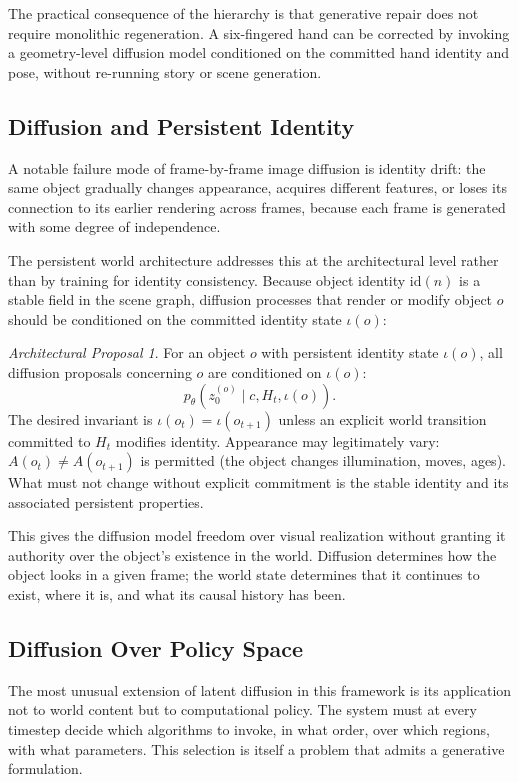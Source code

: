 \documentclass[11pt,a4paper]{article}
\theoremstyle{plain}
\theoremstyle{definition}
\theoremstyle{remark}
\newtheorem{proposal}[theorem]{Architectural Proposal}
\begin{document}
The practical consequence of the hierarchy is that generative repair does not require monolithic regeneration. A six-fingered hand can be corrected by invoking a geometry-level diffusion model conditioned on the committed hand identity and pose, without re-running story or scene generation.

\subsection{Diffusion and Persistent Identity}

A notable failure mode of frame-by-frame image diffusion is identity drift: the same object gradually changes appearance, acquires different features, or loses its connection to its earlier rendering across frames, because each frame is generated with some degree of independence.

The persistent world architecture addresses this at the architectural level rather than by training for identity consistency. Because object identity $\mathrm{id}(n)$ is a stable field in the scene graph, diffusion processes that render or modify object $o$ should be conditioned on the committed identity state $\iota(o)$:

\begin{proposal}
For an object $o$ with persistent identity state $\iota(o)$, all diffusion proposals concerning $o$ are conditioned on $\iota(o)$:
\[
p_\theta(z_0^{(o)} \mid c, H_t, \iota(o)).
\]
The desired invariant is $\iota(o_t) = \iota(o_{t+1})$ unless an explicit world transition committed to $H_t$ modifies identity. Appearance may legitimately vary: $A(o_t) \neq A(o_{t+1})$ is permitted (the object changes illumination, moves, ages). What must not change without explicit commitment is the stable identity and its associated persistent properties.
\end{proposal}

This gives the diffusion model freedom over visual realization without granting it authority over the object's existence in the world. Diffusion determines how the object looks in a given frame; the world state determines that it continues to exist, where it is, and what its causal history has been.

\subsection{Diffusion Over Policy Space}

The most unusual extension of latent diffusion in this framework is its application not to world content but to computational policy. The system must at every timestep decide which algorithms to invoke, in what order, over which regions, with what parameters. This selection is itself a problem that admits a generative formulation.
\end{document}
